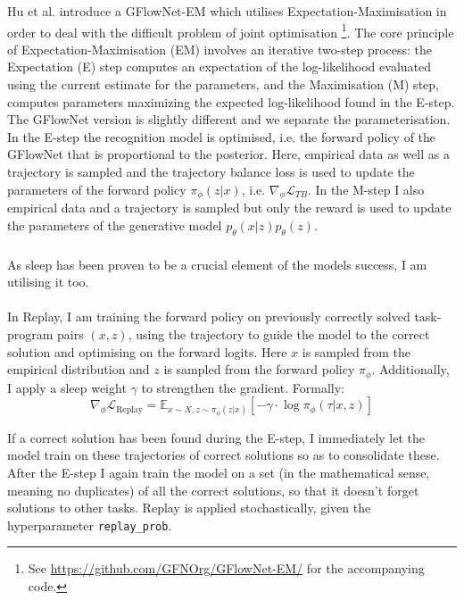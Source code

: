 \subsubsection{}
Hu et al. introduce a GFlowNet-EM which utilises Expectation-Maximisation in order to deal with the difficult problem of joint optimisation \cite{hu_gflownet-em_2023} \footnote{See \url{https://github.com/GFNOrg/GFlowNet-EM/} for the accompanying code.}.
The core principle of Expectation-Maximisation (EM) involves an iterative two-step process: the Expectation (E) step computes an expectation of the log-likelihood evaluated using the current estimate for the parameters, and the Maximisation (M) step, computes parameters maximizing the expected log-likelihood found in the E-step. The GFlowNet version is slightly different and we separate the parameterisation.
In the E-step the recognition model is optimised, i.e. the forward policy of the GFlowNet that is proportional to the posterior.
Here, empirical data as well as a trajectory is sampled and the trajectory balance loss is used to update the parameters of the forward policy $\pi_\phi(z|x)$, i.e. $\nabla_\phi \mathcal{L}_{TB}$.
In the M-step I also empirical data and a trajectory is sampled but only the reward is used to update the parameters of the generative model $p_\theta(x \vert z) p_\theta(z)$.

\subsubsection{}
As sleep has been proven to be a crucial element of the models success, I am utilising it too. 
\paragraph{}
In Replay, I am training the forward policy on previously correctly solved task-program pairs $(x, z)$, using the trajectory to guide the model to the correct solution and optimising on the forward logits. Here $x$ is sampled from the empirical distribution and $z$ is sampled from the forward policy $\pi_\phi$. Additionally, I apply a sleep weight $\gamma$ to strengthen the gradient. Formally:
\begin{equation}
    \nabla_\phi\mathcal{L}_{\text{Replay}} = \mathbb{E}_{x \sim X, z \sim \pi_\phi(z|x)} \left[ - \gamma \cdot \log \pi_\phi(\tau \vert x, z) \right]
\end{equation}

If a correct solution has been found during the E-step, I immediately let the model train on these trajectories of correct solutions so as to consolidate these.
After the E-step I again train the model on a set (in the mathematical sense, meaning no duplicates) of all the correct solutions, so that it doesn't forget solutions to other tasks.
Replay is applied stochastically, given the hyperparameter \texttt{replay\_prob}.

